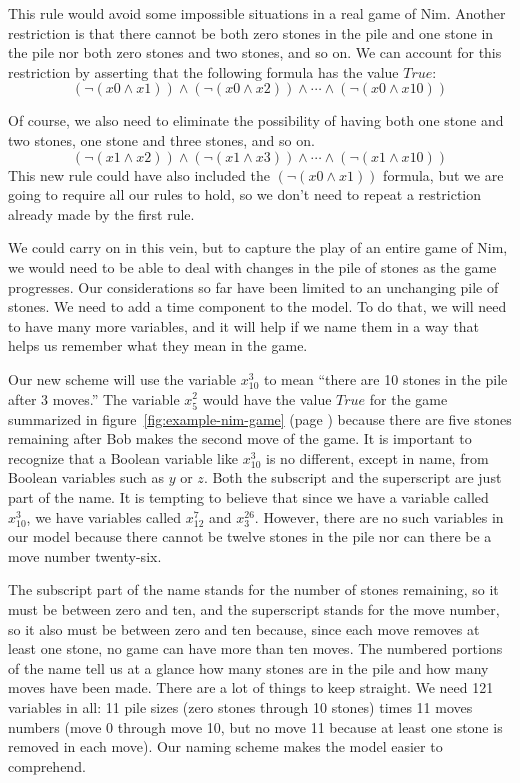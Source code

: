 {{This rule would avoid some impossible situations in a real game of Nim.
Another restriction is that there cannot be both zero stones in the pile
and one stone in the pile nor both zero stones and two stones, and so on.
We can account for this restriction by asserting that the following formula
has the value $True$:
$$(\neg(x0 \wedge x1)) \wedge (\neg(x0 \wedge x2)) \wedge \cdots \wedge (\neg(x0 \wedge x10))$$

Of course,
we also need to eliminate the possibility of having
both one stone and two stones, one stone and three stones, and so on.
$$(\neg(x1 \wedge x2)) \wedge (\neg(x1 \wedge x3)) \wedge \cdots \wedge (\neg(x1 \wedge x10))$$
This new rule could have also included the $(\neg(x0 \wedge x1))$ formula,
but we are going to require all our rules to hold, so we don't need to
repeat a restriction already made by the first rule.

We could carry on in this vein,
but to capture the play of an entire game of Nim,
we would need to be able to deal with changes in the pile of stones
as the game progresses.
Our considerations so far have been limited to an unchanging pile of stones.
We need to add a time component to the model.
To do that, we will need to have many more variables,
and it will help if we name them in a way that helps
us remember what they mean in the game.

Our new scheme will use the variable $x_{10}^{3}$ to mean
``there are 10 stones in the pile after 3 moves.''
The variable $x_{5}^{2}$ would have the value $True$
for the game summarized in
figure~\ref{fig:example-nim-game} (page \pageref{fig:example-nim-game})
because there are five stones remaining after Bob makes the
second move of the game.
It is important to recognize that a Boolean variable like $x_{10}^{3}$
is no different, except in name, from Boolean variables such as $y$ or $z$.
Both the subscript and the superscript are just part of the name.
It is tempting to believe that since we have a variable called $x_{10}^{3}$,
we have variables called $x_{12}^{7}$ and $x_{3}^{26}$.
However, there are no such variables in our model because there cannot be twelve stones
in the pile nor can there be a move number twenty-six.

The subscript part of the name stands for the number of stones remaining,
so it must be between zero and ten, and the superscript stands for the
move number, so it also must be between zero and ten because,
since each move removes at least one stone, no game can have more than ten moves.
The numbered portions of the name tell us at
a glance how many stones are in the pile
and how many moves have been made.
There are a lot of things to keep straight.
We need 121 variables in all: 11 pile sizes (zero stones through 10 stones)
times 11 moves numbers (move 0 through move 10,
but no move 11 because at least one stone is removed in each move).
Our naming scheme makes the model easier to comprehend.

}}
